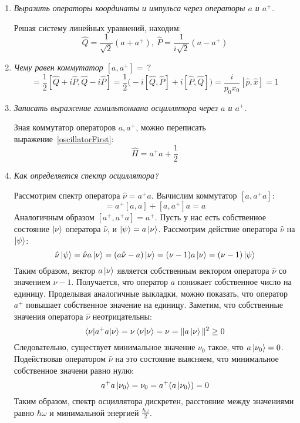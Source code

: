 \documentclass{article}
\begin{document}
\begin{enumerate}
	\item \textit{Выразить операторы координаты и импульса через операторы $a$ и $a^+$.}
	
	Решая систему линейных уравнений, находим:
	\begin{equation}
		\hat{Q} = \frac{1}{\sqrt{2}}(a + a^+), \ \hat{P} = \frac{1}{i\sqrt{2}}(a - a^+)
	\end{equation}
	
	\item \textit{Чему равен коммутатор $[a,a^+] = \ ?$}
	\begin{equation}
		[a,a^+] = \frac{1}{2}[\hat{Q} + i\hat{P}, \hat{Q} - i\hat{P}] = \frac{1}{2}\Big(-i[\hat{Q},\hat{P}] + i[\hat{P},\hat{Q}] \Big) = \frac{i}{p_0 x_0}[\hat{p}, \hat{x}] = 1
	\end{equation}
	
	\item \textit{Записать выражение гамильтониана осциллятора через $a$ и $a^+$.}
	
	Зная коммутатор операторов $a, a^+$, можно переписать выражение~\eqref{oscillatorFirst}:
	\begin{equation}
		\hat{H} = a^+a + \frac{1}{2}
	\end{equation}
	
	\item \textit{Как определяется спектр осциллятора?}
	
	Рассмотрим спектр оператора $\hat{\nu} = a^+a$. Вычислим коммутатор $[a,a^+a]$:
	\begin{equation}
		[a,a^+a] = a^+[a,a] + [a,a^+]a = a
	\end{equation}
	Аналогичным образом $[a^+,a^+a] = a^+$. Пусть у нас есть собственное состояние $\ket{\nu}$ оператора $\hat{\nu}$, и $\ket{\psi} = a\ket{\nu}$. Рассмотрим действие оператора $\hat{\nu}$ на $\ket{\psi}$:
	\begin{equation}
		\hat{\nu}\ket{\psi} = \hat{\nu} a\ket{\nu} = (a\hat{\nu} - a)\ket{\nu} = (\nu - 1)a\ket{\nu} = (\nu - 1)\ket{\psi}
	\end{equation}
	Таким образом, вектор $a\ket{\nu}$ является собственным вектором оператора $\hat{\nu}$ со значением $\nu - 1$. Получается, что оператор $a$ понижает собственное число на единицу. Проделывая аналогичные выкладки, можно показать, что оператор $a^+$ повышает собственное значение на единицу. Заметим, что собственные значения оператора $\hat{\nu}$ неотрицательны:
	\begin{equation}
		\braket{\nu|a^+a|\nu} = \nu\braket{\nu|\nu} = \nu = \| a\ket{\nu}\|^2 \geq 0
	\end{equation}
	Следовательно, существует минимальное значение $\nu_0$ такое, что $a\ket{\nu_0} = 0$. Подействовав оператором $\hat{\nu}$ на это состояние выясняем, что минимальное собственное значени равно нулю:
	\begin{equation}
		a^+a\ket{\nu_0} = \nu_0 = a^+ (a\ket{\nu_0}) = 0
	\end{equation}
	Таким образом, спектр осциллятора дискретен, расстояние между значениями равно $\hbar\omega$ и минимальной энергией $\frac{\hbar\omega}{2}$.
	

\end{enumerate}
\end{document}
